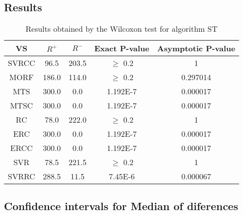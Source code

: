 \documentclass[a4paper,10pt]{article}
\begin{document}
\subsection{Results}

\begin{table}[!htp]
\centering\small
\begin{tabular}{
|c|c|c|c|c|}
\hline
 VS & $R^{+}$ & $R^{-}$ & Exact P-value & Asymptotic P-value \\ \hline 
SVRCC & 96.5 & 203.5 & $\geq$ 0.2 & 1\\ \hline 
MORF & 186.0 & 114.0 & $\geq$ 0.2 & 0.297014\\ \hline 
MTS & 300.0 & 0.0 & 1.192E-7 & 0.000017\\ \hline 
MTSC & 300.0 & 0.0 & 1.192E-7 & 0.000017\\ \hline 
RC & 78.0 & 222.0 & $\geq$ 0.2 & 1\\ \hline 
ERC & 300.0 & 0.0 & 1.192E-7 & 0.000017\\ \hline 
ERCC & 300.0 & 0.0 & 1.192E-7 & 0.000017\\ \hline 
SVR & 78.5 & 221.5 & $\geq$ 0.2 & 1\\ \hline 
SVRRC & 288.5 & 11.5 & 7.45E-6 & 0.000067\\ \hline 

\end{tabular}
\caption{Results obtained by the Wilcoxon test for algorithm ST}
\end{table}

\subsection{Confidence intervals for Median of diferences}
\end{document}
